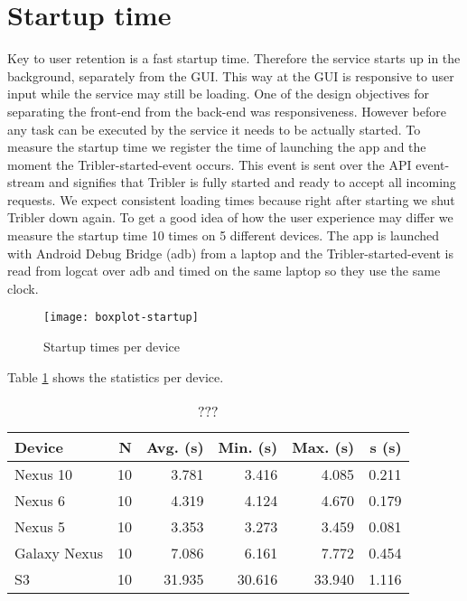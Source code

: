 \section{Startup time}

Key to user retention is a fast startup time.
Therefore the service starts up in the background, separately from the GUI.
This way at the GUI is responsive to user input while the service may still be loading.
One of the design objectives for separating the front-end from the back-end was responsiveness.
However before any task can be executed by the service it needs to be actually started.
To measure the startup time we register the time of launching the app and the moment the Tribler-started-event occurs.
This event is sent over the API event-stream and signifies that Tribler is fully started and ready to accept all incoming requests.
We expect consistent loading times because right after starting we shut Tribler down again.
To get a good idea of how the user experience may differ we measure the startup time 10 times on 5 different devices.
The app is launched with Android Debug Bridge (adb) from a laptop and the Tribler-started-event is read from logcat over adb and timed on the same laptop so they use the same clock.
\begin{figure}[H]
	\centering %
	\texttt{[image: boxplot-startup]}
	\caption{Startup times per device}
	\label{fig:boxplot-startup}
\end{figure}
Table \ref{table:startup_time} shows the statistics per device.
\begin{table}
	\begin{tabular}{l | *{5}{r}} \hline
		Device & N & Avg. (s) & Min. (s) & Max. (s) & s (s) \\ \hline \hline
		Nexus 10        & 10 & 3.781 & 3.416 & 4.085 & 0.211 \\ \hline
		Nexus 6          & 10 & 4.319 & 4.124 & 4.670 & 0.179 \\ \hline
		Nexus 5          & 10 & 3.353 & 3.273 & 3.459 & 0.081 \\ \hline
		Galaxy Nexus & 10 & 7.086 & 6.161 & 7.772 & 0.454 \\ \hline
		S3                   & 10 & 31.935 & 30.616 & 33.940 & 1.116 \\ \hline
	\end{tabular}
	\caption{???}
	\label{table:startup_time}
\end{table}
